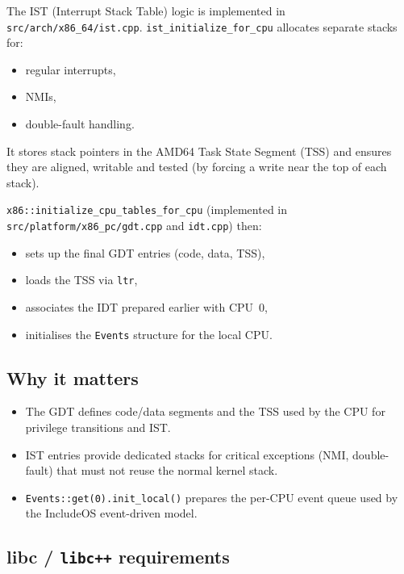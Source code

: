 \documentclass[a4paper,11pt]{article}
\begin{document}
The IST (Interrupt Stack Table) logic is implemented in
\texttt{src/arch/x86\_64/ist.cpp}. \texttt{ist\_initialize\_for\_cpu}
allocates separate stacks for:

\begin{itemize}
  \item regular interrupts,
  \item NMIs,
  \item double-fault handling.
\end{itemize}

It stores stack pointers in the AMD64 Task State Segment (TSS) and
ensures they are aligned, writable and tested (by forcing a write near
the top of each stack).

\texttt{x86::initialize\_cpu\_tables\_for\_cpu} (implemented in
\texttt{src/platform/x86\_pc/gdt.cpp} and \texttt{idt.cpp}) then:

\begin{itemize}
  \item sets up the final GDT entries (code, data, TSS),
  \item loads the TSS via \texttt{ltr},
  \item associates the IDT prepared earlier with CPU~0,
  \item initialises the \texttt{Events} structure for the local CPU.
\end{itemize}

\subsection{Why it matters}

\begin{itemize}
  \item The GDT defines code/data segments and the TSS used by the CPU
        for privilege transitions and IST.
  \item IST entries provide dedicated stacks for critical exceptions
        (NMI, double-fault) that must not reuse the normal kernel stack.
  \item \texttt{Events::get(0).init\_local()} prepares the per-CPU event
        queue used by the IncludeOS event-driven model.
\end{itemize}

\subsection{libc / \texorpdfstring{\texttt{libc++}}{libc++} requirements}
\end{document}
